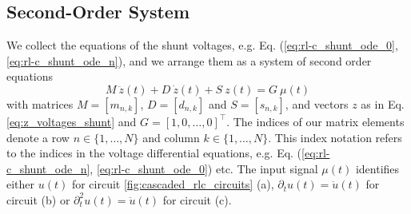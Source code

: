 \documentclass[a4paper, 10pt, twoside, twocolumn]{scrartcl}
\begin{document}
\subsection{Second-Order System}

We collect the equations of the shunt voltages, e.g. Eq.  (\ref{eq:rl-c_shunt_ode_0}, \ref{eq:rl-c_shunt_ode_n}), and we arrange them as a system of second order equations
\begin{equation}
	M~ \ddot{z}(t) + D~ \dot{z}(t) + S~ z(t) = G ~ \mu(t)
	\label{eq:rlc_second_order_1}
\end{equation}
with matrices $M = \left[ m_{n,k} \right]$, $D = \left[ d_{n,k} \right]$ and  $S = \left[ s_{n,k} \right]$, and vectors $z$ as in Eq. \eqref{eq:z_voltages_shunt} and  $G = [1, 0, \ldots, 0]^{\top}$. The indices of our matrix elements denote a row $n\in \{1,\ldots,N\}$ and column $k\in \{1,\ldots,N\}$. This index notation refers to the indices in the voltage differential equations, e.g. Eq. (\ref{eq:rl-c_shunt_ode_n}, \ref{eq:rl-c_shunt_ode_0}) etc. The input signal $\mu(t)$ identifies either $u(t)$ for circuit \ref{fig:cascaded_rlc_circuits} (a), $\partial_{t} u(t) = \dot{u}(t)$  for circuit (b) or  $\partial_{t}^2 u(t) = \ddot{u}(t)$ for circuit (c).
\end{document}

